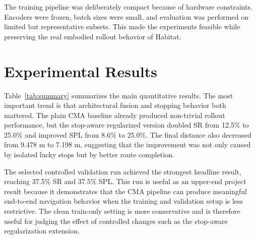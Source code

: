 The training pipeline was deliberately compact because of hardware constraints. Encoders were frozen, batch sizes were small, and evaluation was performed on limited but representative subsets. This made the experiments feasible while preserving the real embodied rollout behavior of Habitat.

\section{Experimental Results}

Table~\ref{tab:summary} summarizes the main quantitative results. The most important trend is that architectural fusion and stopping behavior both mattered. The plain CMA baseline already produced non-trivial rollout performance, but the stop-aware regularized version doubled SR from 12.5\% to 25.0\% and improved SPL from 8.6\% to 25.0\%. The final distance also decreased from 9.478 m to 7.198 m, suggesting that the improvement was not only caused by isolated lucky stops but by better route completion.

The selected controlled validation run achieved the strongest headline result, reaching 37.5\% SR and 37.5\% SPL. This run is useful as an upper-end project result because it demonstrates that the CMA pipeline can produce meaningful end-to-end navigation behavior when the training and validation setup is less restrictive. The clean train-only setting is more conservative and is therefore useful for judging the effect of controlled changes such as the stop-aware regularization extension.

